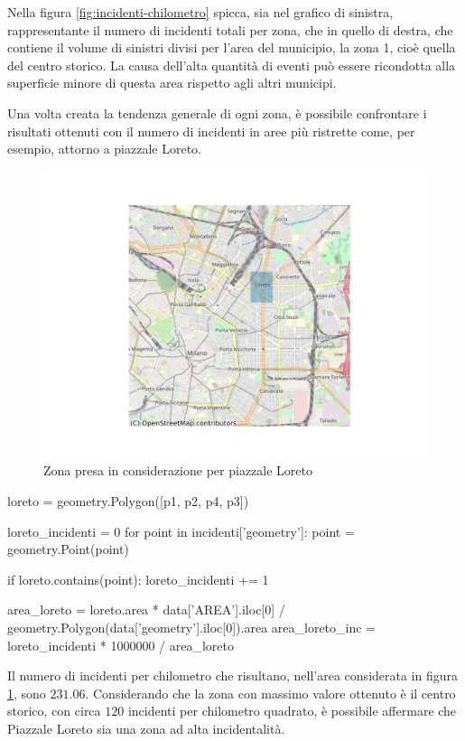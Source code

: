 \documentclass[a4paper]{report}
\begin{document}
Nella figura \ref{fig:incidenti-chilometro} spicca, sia nel grafico di sinistra, rappresentante 
il numero di incidenti totali per zona, che in 
quello di destra, che contiene il volume di sinistri divisi per l'area del municipio, 
la zona 1, cioè quella del centro storico. 
La causa dell'alta quantità di eventi può essere ricondotta alla superficie minore 
di questa area rispetto agli altri municipi. 

Una volta creata la tendenza generale di ogni zona, è possibile confrontare i risultati 
ottenuti con il numero di incidenti in aree più ristrette come, per esempio, 
attorno a piazzale Loreto. 

\begin{figure}
    \hfill\includegraphics[width=0.7\linewidth]{../src/municipi_milano/zona_loreto.png}\hspace*{\fill}
    \caption{Zona presa in considerazione per piazzale Loreto}
    \label{fig:zona-loreto}
\end{figure}

\begin{code}
loreto = geometry.Polygon([p1, p2, p4, p3])

loreto_incidenti = 0
for point in incidenti['geometry']: 
    point = geometry.Point(point)

    if loreto.contains(point): 
        loreto_incidenti += 1

area_loreto = loreto.area * data['AREA'].iloc[0] / geometry.Polygon(data['geometry'].iloc[0]).area
area_loreto_inc = loreto_incidenti * 1000000 / area_loreto
\end{code}

Il numero di incidenti per chilometro che risultano, nell'area considerata in figura 
\ref{fig:zona-loreto}, sono $231.06$. 
Considerando che la zona con massimo valore ottenuto è il centro storico, 
con circa $120$ incidenti per chilometro quadrato, è possibile affermare 
che Piazzale Loreto sia una zona ad alta incidentalità. 
\end{document}
